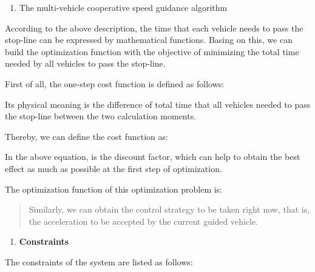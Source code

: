 \begin{enumerate}
\def\labelenumi{\arabic{enumi})}
\item
  The multi-vehicle cooperative speed guidance algorithm
\end{enumerate}

According to the above description, the time that each vehicle needs to
pass the stop-line can be expressed by mathematical functions. Basing on
this, we can build the optimization function with the objective of
minimizing the total time needed by all vehicles to pass the stop-line.

First of all, the one-step cost function is defined as follows:

Its physical meaning is the difference of total time that all vehicles
needed to pass the stop-line between the two calculation moments.

Thereby, we can define the cost function as:

In the above equation, is the discount factor, which can help to obtain
the best effect as much as possible at the first step of optimization.

The optimization function of this optimization problem is:

\begin{quote}
Similarly, we can obtain the control strategy to be taken right now,
that is, the acceleration to be accepted by the current guided vehicle.
\end{quote}

\begin{enumerate}
\def\labelenumi{\arabic{enumi}.}
\item
  \textbf{Constraints}
\end{enumerate}

The constraints of the system are listed as follows:

